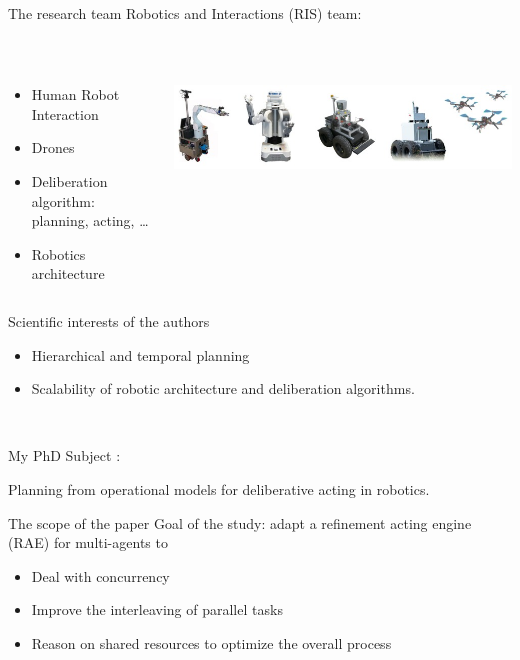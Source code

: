 \begin{frame}{The research team}
\centering
    Robotics and Interactions (RIS) team:
    
    ~~

\begin{columns}
    \begin{column}{0.5\textwidth}
\begin{itemize}
    \item Human Robot Interaction
    \item Drones
    \item Deliberation algorithm: planning, acting, \dots
    \item Robotics architecture
\end{itemize}
    \end{column}
    \begin{column}{0.5\textwidth}
        \includegraphics[width=\textwidth]{images/RIS-robot-banner.jpg}
    \end{column}
\end{columns}

\end{frame}
\begin{frame}{Scientific interests of the authors}
    \centering

\begin{itemize}
    \item Hierarchical and temporal planning
    \item Scalability of robotic architecture and deliberation algorithms.
\end{itemize}

~

My PhD Subject :

Planning from operational models for deliberative acting in robotics.

\end{frame}

\begin{frame}{The scope of the paper}
    Goal of the study: adapt a refinement acting engine (RAE) for multi-agents to
    \begin{itemize}
        \item Deal with concurrency
        \item Improve the interleaving of parallel tasks
        \item Reason on shared resources to optimize the overall process
    \end{itemize}
\end{frame}
